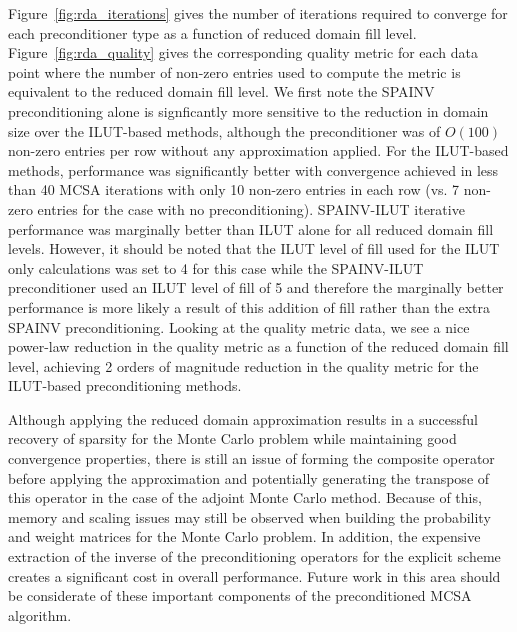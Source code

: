 Figure~\ref{fig:rda_iterations} gives the number of iterations
required to converge for each preconditioner type as a function of
reduced domain fill level. Figure~\ref{fig:rda_quality} gives the
corresponding quality metric for each data point where the number of
non-zero entries used to compute the metric is equivalent to the
reduced domain fill level. We first note the SPAINV preconditioning
alone is signficantly more sensitive to the reduction in domain size
over the ILUT-based methods, although the preconditioner was of
$O(100)$ non-zero entries per row without any approximation
applied. For the ILUT-based methods, performance was significantly
better with convergence achieved in less than 40 MCSA iterations with
only 10 non-zero entries in each row (vs. 7 non-zero entries for the
case with no preconditioning). SPAINV-ILUT iterative performance was
marginally better than ILUT alone for all reduced domain fill
levels. However, it should be noted that the ILUT level of fill used
for the ILUT only calculations was set to 4 for this case while the
SPAINV-ILUT preconditioner used an ILUT level of fill of 5 and
therefore the marginally better performance is more likely a result of
this addition of fill rather than the extra SPAINV
preconditioning. Looking at the quality metric data, we see a nice
power-law reduction in the quality metric as a function of the reduced
domain fill level, achieving 2 orders of magnitude reduction in the
quality metric for the ILUT-based preconditioning methods.

Although applying the reduced domain approximation results in a
successful recovery of sparsity for the Monte Carlo problem while
maintaining good convergence properties, there is still an issue of
forming the composite operator before applying the approximation and
potentially generating the transpose of this operator in the case of
the adjoint Monte Carlo method. Because of this, memory and scaling
issues may still be observed when building the probability and weight
matrices for the Monte Carlo problem. In addition, the expensive
extraction of the inverse of the preconditioning operators for the
explicit scheme creates a significant cost in overall
performance. Future work in this area should be considerate of these
important components of the preconditioned MCSA algorithm.


